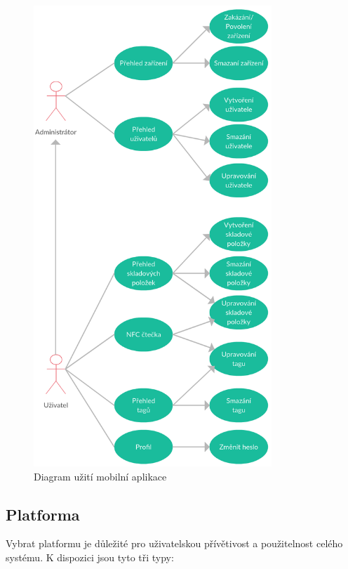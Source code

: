 \documentclass[czech,BP]{thesiskiv}
\begin{document}
\begin{figure}[H]
		\centering
		\includegraphics[width=0.8\textwidth]{../diagrams/mobile_app_use_case.png}	
		\caption{Diagram užití mobilní aplikace}
		\label{fig:mobile_app_use_case}
	\end{figure}
		
		
		
		\subsection{Platforma}
			Vybrat platformu je důležité pro uživatelskou přívětivost a použitelnost celého systému. K dispozici jsou tyto tři typy: 		
			
\end{document}
